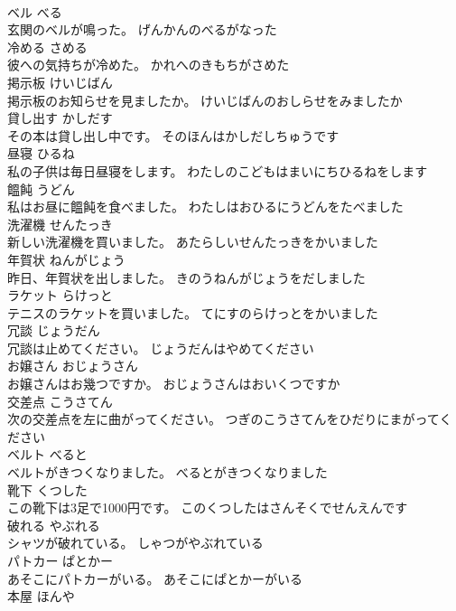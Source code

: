 \documentclass[8pt]{extreport}
\begin{document}
\begin{CJK}{UTF8}{min}
\\	ベル	べる	
\\	玄関のベルが鳴った。	げんかんのべるがなった	
\\	冷める	さめる	
\\	彼への気持ちが冷めた。	かれへのきもちがさめた	
\\	掲示板	けいじばん	
\\	掲示板のお知らせを見ましたか。	けいじばんのおしらせをみましたか	
\\	貸し出す	かしだす	
\\	その本は貸し出し中です。	そのほんはかしだしちゅうです	
\\	昼寝	ひるね	
\\	私の子供は毎日昼寝をします。	わたしのこどもはまいにちひるねをします	
\\	饂飩	うどん	
\\	私はお昼に饂飩を食べました。	わたしはおひるにうどんをたべました	
\\	洗濯機	せんたっき	
\\	新しい洗濯機を買いました。	あたらしいせんたっきをかいました	
\\	年賀状	ねんがじょう	
\\	昨日、年賀状を出しました。	きのうねんがじょうをだしました	
\\	ラケット	らけっと	
\\	テニスのラケットを買いました。	てにすのらけっとをかいました	
\\	冗談	じょうだん	
\\	冗談は止めてください。	じょうだんはやめてください	
\\	お嬢さん	おじょうさん	
\\	お嬢さんはお幾つですか。	おじょうさんはおいくつですか	
\\	交差点	こうさてん	
\\	次の交差点を左に曲がってください。	つぎのこうさてんをひだりにまがってください	
\\	ベルト	べると	
\\	ベルトがきつくなりました。	べるとがきつくなりました	
\\	靴下	くつした	
\\	この靴下は3足で1000円です。	このくつしたはさんそくでせんえんです	
\\	破れる	やぶれる	
\\	シャツが破れている。	しゃつがやぶれている	
\\	パトカー	ぱとかー	
\\	あそこにパトカーがいる。	あそこにぱとかーがいる	
\\	本屋	ほんや	

\end{CJK}
\end{document}
